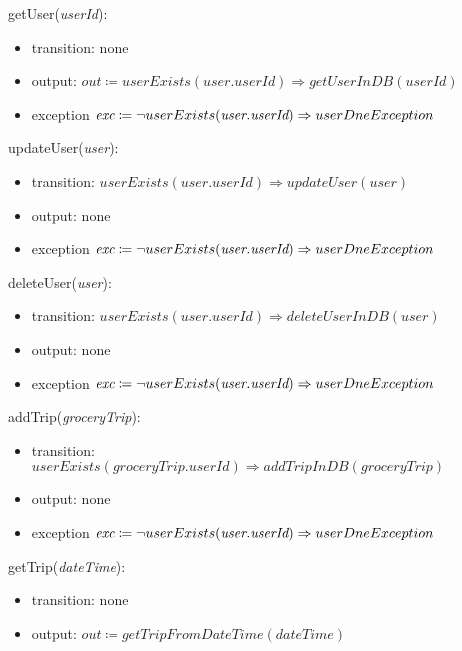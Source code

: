\documentclass[12pt, titlepage]{article}
\begin{document}
\noindent getUser(\textit{userId}):
\begin{itemize}
\item transition: none
\item output: \( \textit{out} \coloneqq userExists(\textit{user.userId}) \Rightarrow getUserInDB(userId)\)
\item exception \( \textit{exc} \coloneqq \neg userExists(\textit{user.userId}) \Rightarrow \\ userDneException\)
\end{itemize}

\noindent updateUser(\textit{user}):
\begin{itemize}
\item transition: \( userExists(\textit{user.userId}) \Rightarrow updateUser(\textit{user})\)
\item output: none
\item exception \( \textit{exc} \coloneqq \neg userExists(\textit{user.userId}) \Rightarrow \\ userDneException\)
\end{itemize}

\noindent deleteUser(\textit{user}):
\begin{itemize}
\item transition: \( userExists(\textit{user.userId}) \Rightarrow deleteUserInDB(\textit{user})\) 
\item output: none
\item exception \( \textit{exc} \coloneqq \neg userExists(\textit{user.userId}) \Rightarrow \\ userDneException\)
\end{itemize}

\noindent addTrip(\textit{groceryTrip}):
\begin{itemize}
\item transition: \( userExists(\textit{groceryTrip.userId}) \Rightarrow addTripInDB(\textit{groceryTrip})\) 
\item output: none
\item exception \( \textit{exc} \coloneqq \neg userExists(\textit{user.userId}) \Rightarrow \\ userDneException\)
\end{itemize}

\noindent getTrip(\textit{dateTime}):
\begin{itemize}
\item transition: none
\item output: \( \textit{out} \coloneqq getTripFromDateTime(\textit{dateTime}) \)
\end{itemize}
\end{document}
